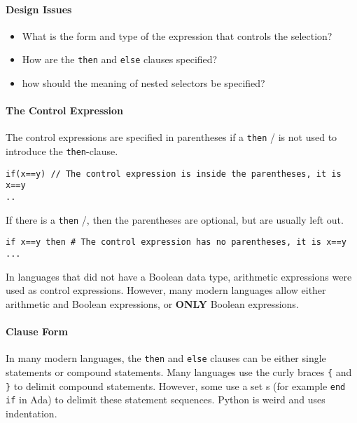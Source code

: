 \paragraph{Design Issues}\label{par:2_Way_Selection-Design_Issues}
\begin{itemize}[noitemsep]
\item What is the form and type of the expression that controls the selection?
\item How are the \texttt{then} and \texttt{else} clauses specified?
\item how should the meaning of nested selectors be specified?
\end{itemize}

\paragraph{The Control Expression}\label{par:2_Way_Selection-Control_Expression}
The control expressions are specified in parentheses if a \texttt{then} / is not used to introduce the \texttt{then}-clause.
\begin{verbatim}
if(x==y) // The control expression is inside the parentheses, it is x==y
..
\end{verbatim}

If there is a \texttt{then} /, then the parentheses are optional, but are usually left out.
\begin{verbatim}
if x==y then # The control expression has no parentheses, it is x==y
...
\end{verbatim}

In languages that did not have a Boolean data type, arithmetic expressions were used as control expressions.
However, many modern languages allow either arithmetic and Boolean expressions, or \textbf{ONLY} Boolean expressions.

\paragraph{Clause Form}\label{par:2_Way_Selection-Clause_Form}
In many modern languages, the \texttt{then} and \texttt{else} clauses can be either single statements or compound statements.
Many languages use the curly braces \texttt{\{} and \texttt{\}} to delimit compound statements.
However, some use a set s (for example \texttt{end if} in Ada) to delimit these statement sequences.
Python is weird and uses indentation.

